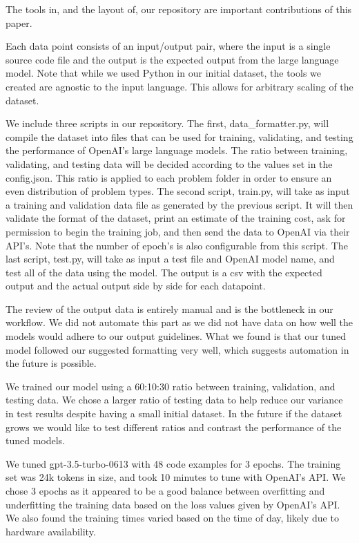 \documentclass[acmsmall]{acmart}
\begin{document}
The tools in, and the layout of, our repository are important contributions of this paper. 

Each data point consists of an input/output pair, where the input is a single source code file and the output is the expected output from the large language model. Note that while we used Python in our initial dataset, the tools we created are agnostic to the input language. This allows for arbitrary scaling of the dataset.

We include three scripts in our repository. The first, data\_formatter.py, will compile the dataset into files that can be used for training, validating, and testing the performance of OpenAI's large language models.
The ratio between training, validating, and testing data will be decided according to the values set in the config.json. This ratio is applied to each problem folder in order to ensure an even distribution of problem types. The second script, train.py, will take as input a training and validation data file as generated by the previous script.
It will then validate the format of the dataset, print an estimate of the training cost, ask for permission to begin the training job, and then send the data to OpenAI via their API's. Note that the number of epoch's is also configurable from this script. The last script, test.py, will take as input a test file and OpenAI model name, and test all of the data using the model. The output is a csv with the expected output and the actual output side by side for each datapoint.

The review of the output data is entirely manual and is the bottleneck in our workflow. We did not automate this part as we did not have data on how well the models would adhere to our output guidelines. What we found is that our tuned model followed our suggested formatting very well, which suggests automation in the future is possible.

We trained our model using a 60:10:30 ratio between training, validation, and testing data. We chose a larger ratio of testing data to help reduce our variance in test results despite having a small initial dataset. In the future if the dataset grows we would like to test different ratios and contrast the performance of the tuned models.

We tuned gpt-3.5-turbo-0613 with 48 code examples for 3 epochs. The training set was 24k tokens in size, and took 10 minutes to tune with OpenAI's API. We chose 3 epochs as it appeared to be a good balance between overfitting and underfitting the training data based on the loss values given by OpenAI's API. We also found the training times varied based on the time of day, likely due to hardware availability.
\end{document}
